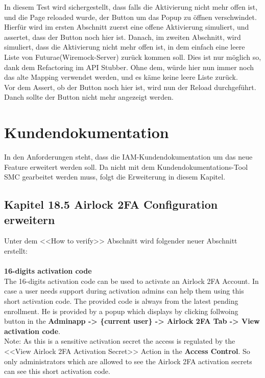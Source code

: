 In diesem Test wird sichergestellt, dass falls die Aktivierung nicht mehr offen ist, und die Page reloaded wurde, der Button um das Popup zu öffnen verschwindet. Hierfür wird im ersten Abschnitt zuerst eine offene Aktivierung simuliert, und assertet, dass der Button noch hier ist. Danach, im zweiten Abschnitt, wird simuliert, dass die Aktivierung nicht mehr offen ist, in dem einfach eine leere Liste von Futurae(Wiremock-Server) zurück kommen soll. Dies ist nur möglich so, dank dem Refactoring im API Stubber. Ohne dem, würde hier nun immer noch das alte Mapping verwendet werden, und es käme keine leere Liste zurück.\\ 
Vor dem Assert, ob der Button noch hier ist, wird nun der Reload durchgeführt. Danch sollte der Button nicht mehr angezeigt werden.
\section{Kundendokumentation}
In den Anforderungen steht, dass die IAM-Kundendokumentation um das neue Feature erweitert werden soll. Da nicht mit dem Kundendokumentations-Tool SMC gearbeitet werden muss, folgt die Erweiterung in diesem Kapitel.
\subsection{Kapitel 18.5 Airlock 2FA Configuration erweitern}
Unter dem <<How to verify>> Abschnitt wird folgender neuer Abschnitt erstellt:\\\\
\textbf{16-digits activation code}\\
The 16-digits activation code can be used to activate an Airlock 2FA Account. In case a user needs support during activation admins can help them using this short activation code. The provided code is always from the latest pending enrollment. He is provided by a popup which displays by clicking follwoing button in the \textbf{Adminapp -> \{current user\} -> Airlock 2FA Tab -> View activation code}.\\
Note: As this is a sensitive activation secret the access is regulated by the <<View Airlock 2FA Activation Secret>> Action in the \textbf{Access Control}. So only administrators which are allowed to see the Airlock 2FA activation secrets can see this short activation code.














